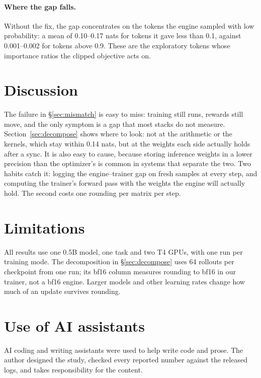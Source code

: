 \documentclass[11pt]{article}
\begin{document}
\paragraph{Where the gap falls.} Without the fix, the gap concentrates on the tokens the engine
sampled with low probability: a mean of 0.10--0.17 nats for tokens it gave less than 0.1, against
0.001--0.002 for tokens above 0.9. These are the exploratory tokens whose importance ratios the
clipped objective acts on.

\section{Discussion}

The failure in \S\ref{sec:mismatch} is easy to miss: training still runs, rewards still move, and
the only symptom is a gap that most stacks do not measure. Section~\ref{sec:decompose} shows where
to look: not at the arithmetic or the kernels, which stay within 0.14 nats, but at the
weights each side actually holds after a sync. It is also easy to cause, because
storing inference weights in a lower precision than the optimizer's is common in systems that
separate the two. Two habits catch it: logging the engine--trainer gap on fresh
samples at every step, and computing the trainer's forward pass with the weights the engine will
actually hold. The second costs one rounding per matrix per step.

\section*{Limitations}

All results use one 0.5B model, one task and two T4 GPUs, with one run per training mode. The
decomposition in \S\ref{sec:decompose} uses 64 rollouts per checkpoint from one run; its bf16
column measures rounding to bf16 in our trainer, not a bf16 engine. Larger models and other
learning rates change how much of an update survives rounding.

\section*{Use of AI assistants}

AI coding and writing assistants were used to help write code and prose. The author designed the
study, checked every reported number against the released logs, and takes responsibility for the
content.


\end{document}

